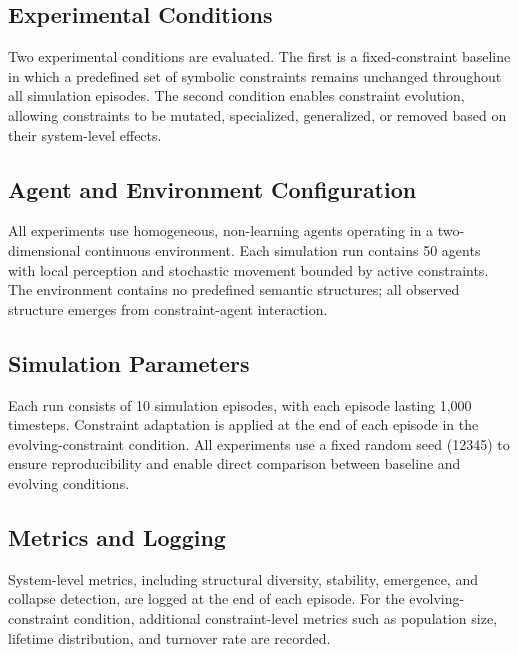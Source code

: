 \subsection{Experimental Conditions}

Two experimental conditions are evaluated. The first is a fixed-constraint baseline in which a predefined set of symbolic constraints remains unchanged throughout all simulation episodes. The second condition enables constraint evolution, allowing constraints to be mutated, specialized, generalized, or removed based on their system-level effects.

\subsection{Agent and Environment Configuration}

All experiments use homogeneous, non-learning agents operating in a two-dimensional continuous environment. Each simulation run contains 50 agents with local perception and stochastic movement bounded by active constraints. The environment contains no predefined semantic structures; all observed structure emerges from constraint-agent interaction.

\subsection{Simulation Parameters}

Each run consists of 10 simulation episodes, with each episode lasting 1,000 timesteps. Constraint adaptation is applied at the end of each episode in the evolving-constraint condition. All experiments use a fixed random seed (12345) to ensure reproducibility and enable direct comparison between baseline and evolving conditions.

\subsection{Metrics and Logging}

System-level metrics, including structural diversity, stability, emergence, and collapse detection, are logged at the end of each episode. For the evolving-constraint condition, additional constraint-level metrics such as population size, lifetime distribution, and turnover rate are recorded.

